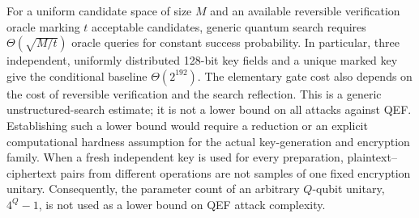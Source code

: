{\color{red}
For a uniform candidate space of size $M$ and an available reversible
verification oracle marking $t$ acceptable candidates, generic quantum
search requires $\Theta(\sqrt{M/t})$ oracle queries for constant success
probability. In particular, three independent, uniformly distributed
128-bit key fields and a unique marked key give the conditional baseline
$\Theta(2^{192})$. The elementary gate cost also depends on the cost of
reversible verification and the search reflection. This is a generic
unstructured-search estimate; it is not a lower bound on all attacks
against QEF. Establishing such a lower bound would require a reduction
or an explicit computational hardness assumption for the actual
key-generation and encryption family. When a fresh independent key is
used for every preparation, plaintext--ciphertext pairs from different
operations are not samples of one fixed encryption unitary. Consequently,
the parameter count of an arbitrary $Q$-qubit unitary, $4^Q-1$, is not
used as a lower bound on QEF attack complexity.
\par}
